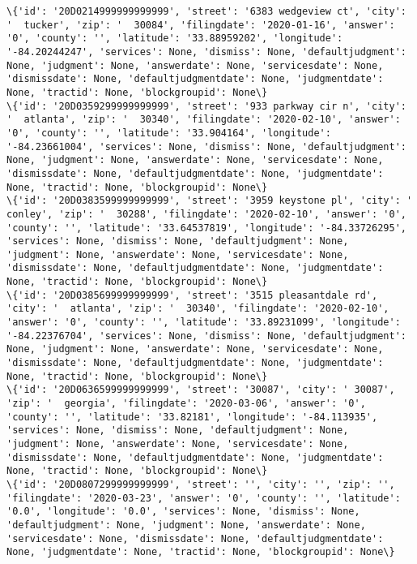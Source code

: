 \documentclass[11pt]{article}
\begin{document}
\begin{Verbatim}[commandchars=\\\{\}]
\{'id': '20D0214999999999999', 'street': '6383 wedgeview ct', 'city': '  tucker', 'zip': '  30084', 'filingdate': '2020-01-16', 'answer': '0', 'county': '', 'latitude': '33.88959202', 'longitude': '-84.20244247', 'services': None, 'dismiss': None, 'defaultjudgment': None, 'judgment': None, 'answerdate': None, 'servicesdate': None, 'dismissdate': None, 'defaultjudgmentdate': None, 'judgmentdate': None, 'tractid': None, 'blockgroupid': None\}
\{'id': '20D0359299999999999', 'street': '933 parkway cir n', 'city': '  atlanta', 'zip': '  30340', 'filingdate': '2020-02-10', 'answer': '0', 'county': '', 'latitude': '33.904164', 'longitude': '-84.23661004', 'services': None, 'dismiss': None, 'defaultjudgment': None, 'judgment': None, 'answerdate': None, 'servicesdate': None, 'dismissdate': None, 'defaultjudgmentdate': None, 'judgmentdate': None, 'tractid': None, 'blockgroupid': None\}
\{'id': '20D0383599999999999', 'street': '3959 keystone pl', 'city': '  conley', 'zip': '  30288', 'filingdate': '2020-02-10', 'answer': '0', 'county': '', 'latitude': '33.64537819', 'longitude': '-84.33726295', 'services': None, 'dismiss': None, 'defaultjudgment': None, 'judgment': None, 'answerdate': None, 'servicesdate': None, 'dismissdate': None, 'defaultjudgmentdate': None, 'judgmentdate': None, 'tractid': None, 'blockgroupid': None\}
\{'id': '20D0385699999999999', 'street': '3515 pleasantdale rd', 'city': '  atlanta', 'zip': '  30340', 'filingdate': '2020-02-10', 'answer': '0', 'county': '', 'latitude': '33.89231099', 'longitude': '-84.22376704', 'services': None, 'dismiss': None, 'defaultjudgment': None, 'judgment': None, 'answerdate': None, 'servicesdate': None, 'dismissdate': None, 'defaultjudgmentdate': None, 'judgmentdate': None, 'tractid': None, 'blockgroupid': None\}
\{'id': '20D0636599999999999', 'street': '30087', 'city': ' 30087', 'zip': '  georgia', 'filingdate': '2020-03-06', 'answer': '0', 'county': '', 'latitude': '33.82181', 'longitude': '-84.113935', 'services': None, 'dismiss': None, 'defaultjudgment': None, 'judgment': None, 'answerdate': None, 'servicesdate': None, 'dismissdate': None, 'defaultjudgmentdate': None, 'judgmentdate': None, 'tractid': None, 'blockgroupid': None\}
\{'id': '20D0807299999999999', 'street': '', 'city': '', 'zip': '', 'filingdate': '2020-03-23', 'answer': '0', 'county': '', 'latitude': '0.0', 'longitude': '0.0', 'services': None, 'dismiss': None, 'defaultjudgment': None, 'judgment': None, 'answerdate': None, 'servicesdate': None, 'dismissdate': None, 'defaultjudgmentdate': None, 'judgmentdate': None, 'tractid': None, 'blockgroupid': None\}

\end{Verbatim}
\end{document}
